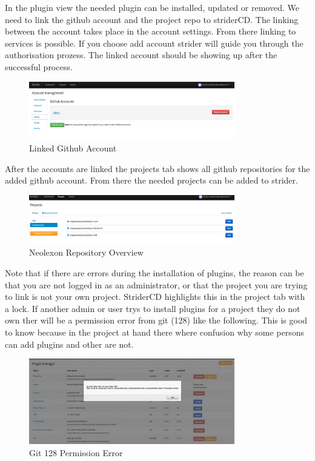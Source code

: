 In the plugin view the needed plugin can be installed, updated or removed. We need to link the github account and the project repo to striderCD.
The linking between the account takes place in the account settings. From there linking to services is possible. If you choose add account strider
will guide you through the authorisation prozess. The linked account should be showing up after the successful process.

\begin{figure}[h!]
  \centering
  \includegraphics[width=0.8\textwidth]{images/linkedGithub.png}
  \caption{Linked Github Account}
\end{figure}

After the accounts are linked the projects tab shows all github repositories for the added github account. From there the needed projects can
be added to strider.

\begin{figure}[h!]
  \centering
  \includegraphics[width=0.8\textwidth]{images/neolexonGit.png}
  \caption{Neolexon Repository Overview}
\end{figure}

Note that if there are errors during the installation of plugins, the reason can be that you are not logged in as an administrator,
or that the project you are trying to link is not your own project. StriderCD highlights this in the project tab with a lock.
If another admin or user trys to install plugins for a project they do not own ther will be a permission error from git (128)
like the following. This is good to know because in the project at hand there where confusion why some persons can add plugins
and other are not.

\begin{figure}[h!]
  \centering
  \includegraphics[width=0.8\textwidth]{images/permissionError.png}
  \caption{Git 128 Permission Error}
\end{figure}

